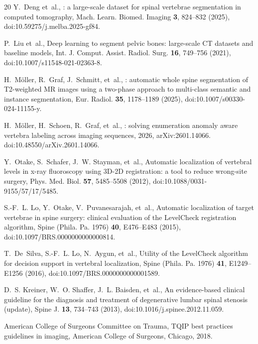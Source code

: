 \documentclass[aapm,mph,amsmath,amssymb,reprint]{revtex4-2}
\begin{document}
\begin{thebibliography}{20}
Y.~Deng et~al.,
: a large-scale dataset for spinal vertebrae segmentation in computed tomography,
\newblock Mach. Learn. Biomed. Imaging {\bf 3}, 824--832 (2025),
\newblock doi:10.59275/j.melba.2025-gf84.

P.~Liu et~al.,
\newblock Deep learning to segment pelvic bones: large-scale {CT} datasets and baseline models,
\newblock Int. J. Comput. Assist. Radiol. Surg. {\bf 16}, 749--756 (2021),
\newblock doi:10.1007/s11548-021-02363-8.

H.~M{\"o}ller, R.~Graf, J.~Schmitt, et~al.,
: automatic whole spine segmentation of {T2}-weighted {MR} images using a two-phase approach to multi-class semantic and instance segmentation,
\newblock Eur. Radiol. {\bf 35}, 1178--1189 (2025),
\newblock doi:10.1007/s00330-024-11155-y.

H.~M{\"o}ller, H.~Schoen, R.~Graf, et~al.,
: solving enumeration anomaly aware vertebra labeling across imaging sequences, 2026,
\newblock arXiv:2601.14066. doi:10.48550/arXiv.2601.14066.

Y.~Otake, S.~Schafer, J.~W. Stayman, et~al.,
\newblock Automatic localization of vertebral levels in x-ray fluoroscopy using {3D-2D} registration: a tool to reduce wrong-site surgery,
\newblock Phys. Med. Biol. {\bf 57}, 5485--5508 (2012),
\newblock doi:10.1088/0031-9155/57/17/5485.

S.-F.~L. Lo, Y.~Otake, V.~Puvanesarajah, et~al.,
\newblock Automatic localization of target vertebrae in spine surgery: clinical evaluation of the {LevelCheck} registration algorithm,
\newblock Spine (Phila. Pa. 1976) {\bf 40}, E476--E483 (2015),
\newblock doi:10.1097/BRS.0000000000000814.

T.~De~Silva, S.-F.~L. Lo, N.~Aygun, et~al.,
\newblock Utility of the {LevelCheck} algorithm for decision support in vertebral localization,
\newblock Spine (Phila. Pa. 1976) {\bf 41}, E1249--E1256 (2016),
\newblock doi:10.1097/BRS.0000000000001589.

D.~S. Kreiner, W.~O. Shaffer, J.~L. Baisden, et~al.,
\newblock An evidence-based clinical guideline for the diagnosis and treatment of degenerative lumbar spinal stenosis (update),
\newblock Spine J. {\bf 13}, 734--743 (2013),
\newblock doi:10.1016/j.spinee.2012.11.059.

American College of Surgeons Committee on Trauma,
 {TQIP} best practices guidelines in imaging,
\newblock American College of Surgeons, Chicago, 2018.


\end{thebibliography}
\end{document}
